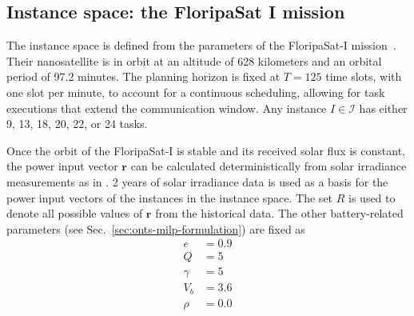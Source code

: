 \subsection{Instance space: the FloripaSat I mission}

The instance space is defined from the parameters of the FloripaSat-I mission~\cite{marcelinoCriticalEmbeddedSystem2020}.
Their nanosatellite is in orbit at an altitude of 628 kilometers and an orbital period of 97.2 minutes.
The planning horizon is fixed at $T=125$ time slots, with one slot per minute, to account for a continuous scheduling, allowing for task executions that extend the communication window.
Any instance $I\in \mathcal{I}$ has either 9, 13, 18, 20, 22, or 24 tasks.

Once the orbit of the FloripaSat-I is stable and its received solar flux is constant, the power input vector $\bm{r}$ can be calculated deterministically from solar irradiance measurements as in .
2 years of solar irradiance data is used as a basis for the power input vectors of the instances in the instance space.
The set $R$ is used to denote all possible values of $\bm{r}$ from the historical data.
The other battery-related parameters (see Sec.~\ref{sec:onts-milp-formulation}) are fixed as 
\begin{align*}
    e &= 0.9 \\
    Q &= 5 \\
    \gamma &= 5 \\
    V_b &= 3.6 \\
    \rho &= 0.0
\end{align*}

